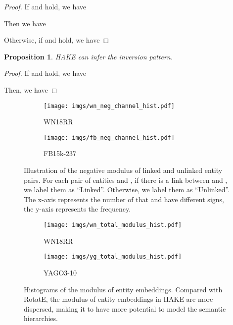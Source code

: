 \documentclass[letterpaper]{article} \usepackage{aaai20}  \usepackage{times}  \usepackage{helvet} \usepackage{courier}  \usepackage[hyphens]{url}  \usepackage{graphicx} \urlstyle{rm} \def\UrlFont{\rm}  \usepackage{graphicx}  \frenchspacing  \setlength{\pdfpagewidth}{8.5in}  \setlength{\pdfpageheight}{11in}
\newtheorem{prop}{Proposition}
\begin{document}
\begin{proof}
    If  and  hold, we have
    
    Then we have
    

    Otherwise, if  and  hold, we have
    
\end{proof}

\begin{prop}
    HAKE can infer the inversion pattern.
\end{prop}

\begin{proof}
    If  and  hold, we have
    
    
    Then, we have
    
\end{proof}

\begin{figure}[!h]
  \centering \begin{subfigure}[b]{0.2\textwidth}
  \texttt{[image: imgs/wn\_neg\_channel\_hist.pdf]}
  \caption{WN18RR}
  \end{subfigure}
  \begin{subfigure}[b]{0.2\textwidth}
  \texttt{[image: imgs/fb\_neg\_channel\_hist.pdf]}
  \caption{FB15k-237}
  \end{subfigure}
\caption{Illustration of the negative modulus of linked and unlinked entity pairs. For each pair of entities  and , if there is a link between  and , we label them as ``Linked''. Otherwise, we label them as ``Unlinked''. The x-axis represents the number of  that  and  have different signs, the y-axis represents the frequency.}
\label{fig:neg_channel_illustration}
\end{figure}

\vspace{5mm}
\begin{figure}[!h]
  \centering \begin{subfigure}[b]{0.2\textwidth}
  \texttt{[image: imgs/wn\_total\_modulus\_hist.pdf]}
  \caption{WN18RR}
  \end{subfigure}
  \begin{subfigure}[b]{0.2\textwidth}
  \texttt{[image: imgs/yg\_total\_modulus\_hist.pdf]}
  \caption{YAGO3-10}
  \end{subfigure}
\caption{Histograms of the modulus of entity embeddings. Compared with RotatE, the modulus of entity embeddings in HAKE are more dispersed, making it to have more potential to model the semantic hierarchies.}
\label{fig:total_modulus_hist}
\end{figure}
\end{document}
